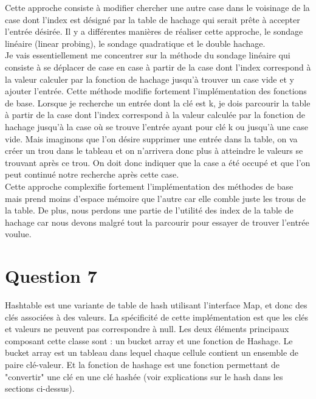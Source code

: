 \documentclass[10pt,a4paper]{article}
\begin{document}
 Cette approche consiste à modifier chercher une autre case dans le voisinage de la case dont l'index est désigné par la table de hachage qui serait prête à accepter l'entrée désirée. Il y a différentes manières de réaliser cette approche, le sondage linéaire (linear probing), le sondage quadratique et le double hachage. \\

Je vais essentiellement me concentrer sur la méthode du sondage linéaire qui consiste à se déplacer de case en case à partir de la case dont l'index correspond à la valeur calculer par la fonction de hachage jusqu'à trouver un case vide et y ajouter l'entrée. Cette méthode modifie fortement l'implémentation des fonctions de base. Lorsque je recherche un entrée dont la clé est k, je dois parcourir la table à partir de la case dont l'index correspond à la valeur calculée par la fonction de hachage jusqu'à la case où se trouve l'entrée ayant pour clé k ou jusqu'à une case vide. Mais imaginons que l'on désire supprimer une entrée dans la table, on va créer un trou dans le tableau et on n'arrivera donc plus à atteindre le valeurs se trouvant après ce trou. On doit donc indiquer que la case a été occupé et que l'on peut continué notre recherche après cette case.\\

Cette approche complexifie fortement l'implémentation des méthodes de base mais prend moins d'espace mémoire que l'autre car elle comble juste les trous de la table. De plus, nous perdons une partie de l'utilité des index de la table de hachage car nous devons malgré tout la parcourir pour essayer de trouver l'entrée voulue.\\
\section*{Question 7}

Hashtable est une variante de table de hash utilisant l'interface Map, et donc des clés associées à des valeurs. La spécificité de cette implémentation est que les clés et valeurs ne peuvent pas correspondre à null. Les deux éléments principaux composant cette classe sont : un bucket array et une fonction de Hashage. Le bucket array est un tableau dans lequel chaque cellule contient un ensemble de paire clé-valeur. Et la fonction de hashage est une fonction permettant de "convertir" une clé en une clé hashée (voir explications sur le hash dans les sections ci-dessus).
\\
\end{document}
